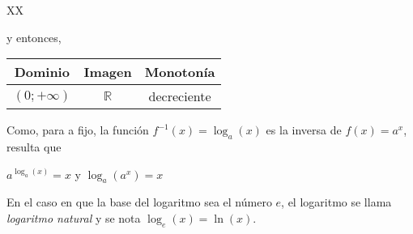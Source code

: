 \documentclass[Análisis.root.tex]{subfiles}
\newcommand{\R}{\mathbb{R}}
\begin{document}
{\begin{tabularx}{\textwidth}{XX}
\begin{center}
\begin{tikzpicture}
                    \end{tikzpicture} 
                \end{center} y entonces,
                \begin{center}
                    \begin{tabular}{|c|c|c|}
                        \hline
                        Dominio & Imagen & Monotonía\\\hline
                        \((0;+\infty)\) & \(\R\) & decreciente\\
                        \hline
                    \end{tabular}
                \end{center}
            \end{tabularx}
        }
        Como, para a fijo, la función \(f^{−1}(x) = \log_a(x)\) es la inversa de \(f(x) = a^x\), resulta que
        \begin{center}
           \(a^{\log_a(x)}=x\) y \(\log_a(a^x)=x\)
        \end{center}
        En el caso en que la base del logaritmo sea el número \(e\), el logaritmo se llama \textit{logaritmo natural} y se nota \(\log_e(x) = \ln(x)\).
\end{document}
